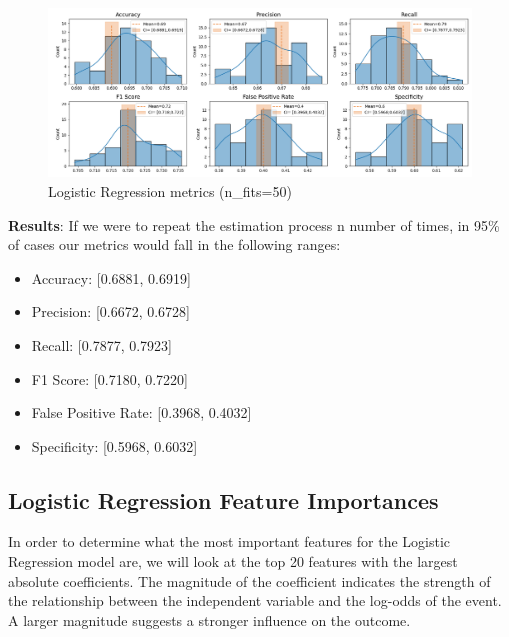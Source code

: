 \documentclass[12pt]{article}
\begin{document}
\begin{figure}[h]
    \centering
    \includegraphics[width=1.15\textwidth]{images/lr_metrics_graph.png}
    \caption{Logistic Regression metrics (n\_fits=50)}
    \label{fig:my_label}
\end{figure}

\textbf{Results}:
\noindent If we were to repeat the estimation process n number of times, in 95\% of cases our metrics would fall in the following ranges:
\begin{itemize}
  \item Accuracy: [0.6881, 0.6919]
  \item Precision: [0.6672, 0.6728]
  \item Recall: [0.7877, 0.7923]
  \item F1 Score: [0.7180, 0.7220]
  \item False Positive Rate: [0.3968, 0.4032]
  \item Specificity: [0.5968, 0.6032]
\end{itemize}

\subsection{Logistic Regression Feature Importances}
In order to determine what the most important features for the Logistic Regression model are, we will look at the top 20 features with the largest absolute coefficients. The magnitude of the coefficient indicates the strength of the relationship between the independent variable and the log-odds of the event. A larger magnitude suggests a stronger influence on the outcome.
\end{document}
